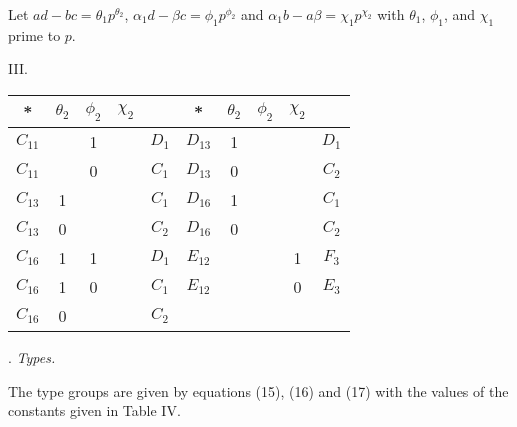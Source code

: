 \documentclass[oneside]{article}
\begin{document}
\medskip
Let $ad - bc = \theta_1 p^{\theta_2}$, $\alpha_1 d - \beta c =
\phi_1 p^{\phi_2}$ and $\alpha_1 b - a\beta = \chi_1 p^{\chi_2}$ with
$\theta_1$, $\phi_1$, and $\chi_1$ prime to $p$.

\begin{center}
\large III. \normalsize

\smallskip
\begin{tabular}{|c|c|c|c|c||c|c|c|c|c|}
\hline
    *   &$\theta_2$&$\phi_2$&$\chi_2$&    &    *   &$\theta_2$&$\phi_2$&$\chi_2$&      \\ \hline
$C_{11}$&          &    1   &       &$D_1$&$D_{13}$&    1     &        &        &$D_1$ \\ \hline
$C_{11}$&          &    0   &       &$C_1$&$D_{13}$&    0     &        &        &$C_2$ \\ \hline
$C_{13}$&    1     &        &       &$C_1$&$D_{16}$&    1     &        &        &$C_1$ \\ \hline
$C_{13}$&    0     &        &       &$C_2$&$D_{16}$&    0     &        &        &$C_2$ \\ \hline
$C_{16}$&    1     &    1   &       &$D_1$&$E_{12}$&          &        &    1   &$F_3$ \\ \hline
$C_{16}$&    1     &    0   &       &$C_1$&$E_{12}$&          &        &    0   &$E_3$ \\ \hline
$C_{16}$&    0     &        &       &$C_2$&        &          &        &        &      \\ \hline
\end{tabular}

. \textit{Types.}
\end{center}

The type groups are given by equations (15), (16) and (17) with the
values of the constants given in Table IV.
\end{document}
